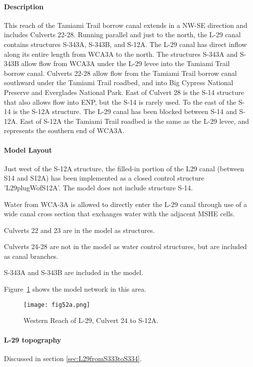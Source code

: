 \paragraph{Description}
This reach of the Tamiami Trail borrow canal extends in a NW-SE direction and includes Culverts 22-28. Running parallel and just to the north, the L-29 canal contains structures S-343A, S-343B, and S-12A. The L-29 canal has direct inflow along its entire length from WCA3A to the north. The structures S-343A and S-343B allow flow from WCA3A under the L-29 levee into the Tamiami Trail borrow canal. Culverts 22-28 allow flow from the Tamiami Trail borrow canal southward under the Tamiami Trail roadbed, and into Big Cypress National Preserve and Everglades National Park. East of Culvert 28 is the S-14 structure that also allows flow into ENP, but the S-14 is rarely used. To the east of the S-14 is the S-12A structure.
The L-29 canal has been blocked between S-14 and S-12A. East of S-12A the Tamiami Trail roadbed is the same as the L-29 levee, and represents the southern end of WCA3A.

\paragraph{Model Layout}
Just west of the S-12A structure, the filled-in portion of the L29 canal (between S14 and S12A) has been implemented as a closed control structure 'L29plugWofS12A'. The model does not include structure S-14.

Water from WCA-3A is allowed to directly enter the L-29 canal through use of a wide canal cross section that exchanges water with the adjacent MSHE cells.

Culverts 22 and 23 are in the model as structures.

Culverts 24-28 are not in the model as water control structures, but are included as canal branches.

S-343A and S-343B are included in the model.

Figure~\ref{fig:fig52a} shows the model network in this area.

\begin{figure}[!h]
  \begin{center}
  \texttt{[image: fig52a.png]}
  \caption{Western Reach of L-29, Culvert 24 to S-12A.}
  \label{fig:fig52a}
  \end{center}
\end{figure}

\paragraph{L-29 topography}
Discussed in section \ref{sec:L29fromS333toS334}.

